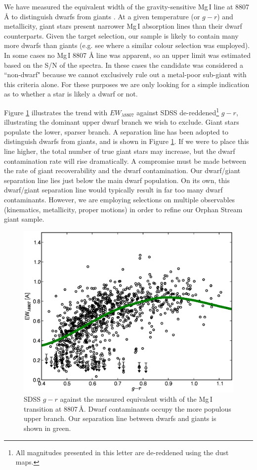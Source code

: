 \documentclass[10pt,apjl]{emulateapj}
\begin{document}
We have measured the equivalent width of the gravity-sensitive Mg\,\textsc{I} line at 8807 \AA{} to distinguish dwarfs from giants \citep{Battaglia_Starkenburg_2012}. At a given temperature (or $g - r$) and metallicity, giant stars present narrower Mg\,\textsc{I} absorption lines than their dwarf counterparts. Given the target selection, our sample is likely to contain many more dwarfs than giants (e.g. see \citet{Casey_et-al_2012} where a similar colour selection was employed). In some cases no Mg\,\textsc{I} 8807 \AA{} line was apparent, so an upper limit was estimated based on the S/N of the spectra. In these cases the candidate was considered a ``non-dwarf" because we cannot exclusively rule out a metal-poor sub-giant with this criteria alone. For these purposes we are only looking for a simple indication as to whether a star is likely a dwarf or not. 

Figure \ref{fig:ew-mg} illustrates the trend with $EW_{\lambda8807}$ against SDSS de-reddened\footnote{All magnitudes presented in this letter are de-reddened using the \citet{Schlegel_Finkbeiner_Davis_1998} dust maps.} $g - r$, illustrating the dominant upper dwarf branch we wish to exclude. Giant stars populate the lower, sparser branch. A separation line has been adopted to distinguish dwarfs from giants, and is shown in Figure \ref{fig:ew-mg}. If we were to place this line higher, the total number of true giant stars may increase, but the dwarf contamination rate will rise dramatically. A compromise must be made between the rate of giant recoverability and the dwarf contamination. Our  dwarf/giant separation line lies just below the main dwarf population. On its own, this dwarf/giant separation line would typically result in far too many dwarf contaminants. However, we are  employing selections on multiple observables (kinematics, metallicity, proper motions) in order to refine our Orphan Stream giant sample. 

\begin{figure}[h]
	\includegraphics[width=\columnwidth]{./fig2.eps}
	\caption{SDSS $g - r$ against the measured equivalent width of the Mg\,\textsc{I} transition at 8807\,\AA{}. Dwarf contaminants occupy the more populous upper branch. Our separation line between dwarfs and giants is shown in green.}
	\label{fig:ew-mg}
\end{figure}
\end{document}
